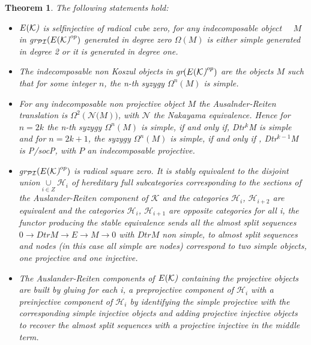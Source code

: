 \documentclass{amsart}
\newtheorem{theorem}{Theorem}
\theoremstyle{plain}
\numberwithin{equation}{section}
\begin{document}
\begin{theorem}
The following statements hold:

\begin{itemize}
\item[(1)] $E(\mathcal{K}\emph{)}$ is selfinjective of radical cube zero,
for any indecomposable object \ \ $M$ in gr$_{\mathcal{PI}}(E(\mathcal{K}\emph{)}^{op})$ generated in degree zero $\Omega (M)$ is either simple
generated in degree 2 or it is generated in degree one.

\item[(2)] The indecomposable non Koszul objects in gr$(E(\mathcal{K}\emph{)}^{op})$ are the objects $M$ such that for some integer $n$, the n-th syzygy $\Omega ^{n}(M)$ is simple.

\item[(3)] For any indecomposable non projective object $M$ the
Ausalnder-Reiten translation is $\Omega ^{2}(\mathcal{N(}M))$, with $\mathcal{N}$ the Nakayama equivalence. Hence for $n=2k$ the n-th syzygy $\Omega ^{n}(M)$ is simple, if and only if, Dtr$^{k}$M is simple and for $n=2k+1$, the syzygy $\Omega ^{n}(M)$ is simple, if and only if , Dtr$^{k-1}$M is P/socP, with $P$ an indecomposable projective.

\item[(4)] gr$_{\mathcal{PI}}(E(\mathcal{K}\emph{)}^{op})$ is radical square
zero. It is stably equivalent to the disjoint union$\underset{i\in Z}{\cup }\mathcal{H}_{i}$ of hereditary full subcategories corresponding to the
sections of the Auslander-Reiten component of $\mathcal{K}$ and the
categories $\mathcal{H}_{i}$, $\mathcal{H}_{i+2}$ are equivalent and the
categories $\mathcal{H}_{i}$, $\mathcal{H}_{i+1}$ are opposite categories
for all i, the functor producing the stable equivalence sends all the almost
split sequences $0\rightarrow DtrM\rightarrow E\rightarrow M\rightarrow 0$
with $DtrM$ non simple, to almost split sequences and nodes (in this case
all simple are nodes) correspond to two simple objects, one projective and
one injective.

\item[(5)] The Auslander-Reiten components of $E(\mathcal{K}\emph{)}$
containing the projective objects are built by gluing for each i, a
preprojective component of $\mathcal{H}_{i}$ with a preinjective component
of $\mathcal{H}_{i}$ by identifying the simple projective with the
corresponding simple injective objects and adding projective injective
objects to recover the almost split sequences with a projective injective in
the middle term.


\end{itemize}
\end{theorem}
\end{document}
